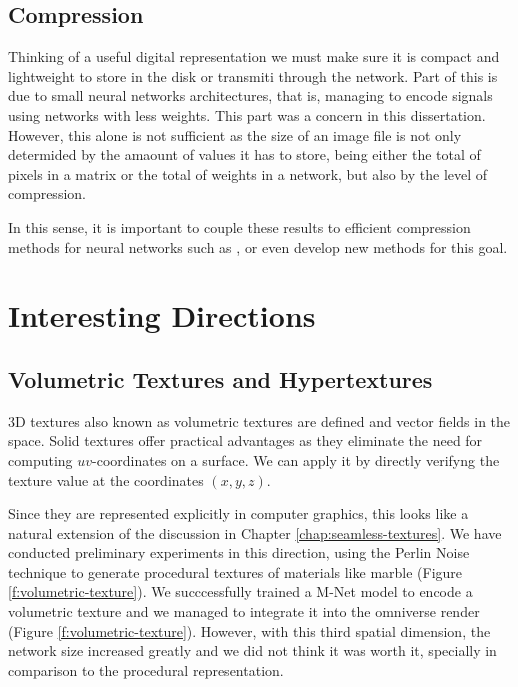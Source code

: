 \subsection{Compression}

Thinking of a useful digital representation we must make sure it is compact and lightweight to store in the disk or transmiti through the network. Part of this is due to small neural networks architectures, that is, managing to encode signals using networks with less weights. This part was a concern in this dissertation. However, this alone is not sufficient as the size of an image file is not only determided by the amaount of values it has to store, being either the total of pixels in a matrix or the total of weights in a network, but also by the level of compression.

In this sense, it is important to couple these results to efficient compression methods for neural networks such as \cite{dupont2021coin}, \cite{dupont2022coinpp} or even develop new methods for this goal.


\section{Interesting Directions}

\subsection{Volumetric Textures and Hypertextures}
\label{sec:3Dtextures}

3D textures also known as volumetric textures are defined and vector fields in the space. Solid textures offer practical advantages as they eliminate the need for computing $uv$-coordinates on a surface. We can apply it by directly verifyng the texture value at the coordinates $(x, y, z)$. 

Since they are represented explicitly in computer graphics, this looks like a natural extension of the discussion in Chapter \ref{chap:seamless-textures}. We have conducted preliminary experiments in this direction, using the Perlin Noise technique to generate procedural textures of materials like marble (Figure \ref{f:volumetric-texture}). We succcessfully trained a M-Net model to encode a volumetric texture and we managed to integrate it into the omniverse render (Figure \ref{f:volumetric-texture}). However, with this third spatial dimension, the network size increased greatly and we did not think it was worth it, specially in comparison to the procedural representation.

